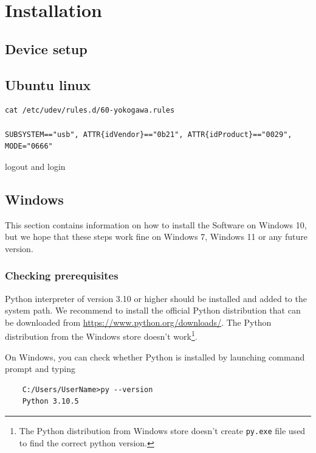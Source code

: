 \chapter{Installation}

\section{Device setup}


\section{Ubuntu linux}


\begin{verbatim}
cat /etc/udev/rules.d/60-yokogawa.rules 

SUBSYSTEM=="usb", ATTR{idVendor}=="0b21", ATTR{idProduct}=="0029", MODE="0666"
\end{verbatim}

logout and login

\section{Windows}

This section contains information on how to install the Software on Windows 10, but we hope that these steps work fine on Windows 7, Windows 11 or any future version.

\subsection{Checking prerequisites}

Python interpreter of version 3.10 or higher should be installed and added to the system path. We recommend to install the official Python distribution that can be downloaded from \url{https://www.python.org/downloads/}. The Python distribution from the Windows store doesn't work\footnote{The Python distribution from Windows store doesn't create \texttt{py.exe} file used to find the correct python version.}.

On Windows, you can check whether Python is installed by launching command prompt and typing
\begin{verbatim}
	C:/Users/UserName>py --version
	Python 3.10.5
\end{verbatim}

